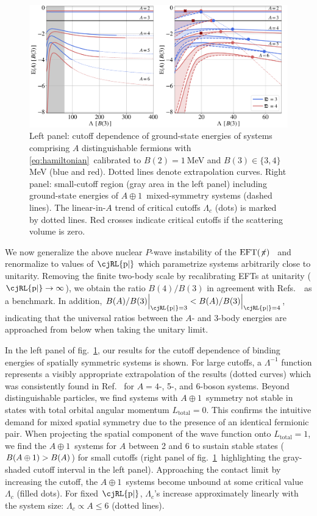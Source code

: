 \documentclass[onecolumn,preprint,superscriptaddress,nofootinbib]{revtex4-1}
\newcommand{\lc}{\ensuremath{\Lambda_c}}
\newcommand{\abb}{\mbox{\ensuremath{A\oplus 1}}}
\newcommand{\eftnopi}{\mbox{EFT$(\not \! \pi)$}}
\newcommand{\Pe}{\text{\cjRL{p|}}}
\newcommand{\figref}[1]{fig.~\ref{#1}}
\begin{document}
%
\begin{figure}
    \centering
        \centering
        \includegraphics[width=\linewidth]{./new-p-wave} 
        \caption{Left panel: cutoff dependence of ground-state energies of systems comprising $A$ distinguishable fermions with \eqref{eq:hamiltonian}~calibrated to $B(2)=1~$MeV and \mbox{$B(3)\in\lbrace3,4\rbrace~$MeV} (blue and red). Dotted lines denote extrapolation curves. Right panel: small-cutoff region
        (gray area in the left panel) including ground-state energies of \abb~mixed-symmetry systems (dashed lines). The linear-in-$A$ trend of critical cutoffs $\lc$ (dots) is marked
        by dotted lines. Red crosses indicate critical cutoffs if the scattering volume is zero.}
        \label{fig:threshold}
\end{figure} 
%

%
We now generalize the above nuclear $P$-wave instability of the $\eftnopi$~
and renormalize to values of $\Pe$ which parametrize systems arbitrarily close to unitarity.
Removing the finite two-body scale by recalibrating EFTs at unitarity ($\Pe\rightarrow \infty$),
we obtain
the ratio $B(4)/B(3)$ in agreement with Refs.~\cite{Hammer:2006ct,2009NatPh...5..417V}~as a
benchmark.
In addition, \mbox{$B(A)/B(3)\Big\vert_{\Pe=3}<B(A)/B(3)\Big\vert_{\Pe=4}$}, indicating that the
universal ratios between the $A$- and 3-body energies are approached from below when taking the
unitary limit.

In the left panel of \figref{fig:threshold},
our results for the cutoff dependence of binding energies of spatially symmetric systems is shown.
For large cutoffs, a $\Lambda^{-1}$ function
represents a visibly appropriate extrapolation of the results (dotted curves)
which was consistently found in Ref.~\cite{Betzalel:2016} for $A=4$-, 5-, and 6-boson systems.
Beyond distinguishable particles, we find systems with \abb~symmetry not stable in states with
total orbital angular momentum $L_\text{total}=0$.
This confirms the intuitive demand for mixed spatial symmetry due to the presence
of an identical fermionic pair.
When projecting the spatial component of the wave function onto \mbox{$L_\text{total}=1$},
we find the \abb~systems for $A$ between 2 and 6 to sustain stable states \mbox{($B(\abb)>B(A)$)}
for small cutoffs
(right panel of \figref{fig:threshold}~highlighting the gray-shaded
cutoff interval in the left panel). 
Approaching the contact limit by increasing the cutoff, the \abb~systems become
unbound at some critical value $\lc$ (filled dots).
For fixed $\Pe$, $\lc$'s increase approximately linearly with the system size:
\mbox{$\lc\propto A \leq 6$} (dotted lines).
\end{document}
